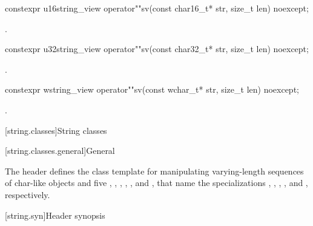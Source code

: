 %
\begin{itemdecl}
constexpr u16string_view operator""sv(const char16_t* str, size_t len) noexcept;
\end{itemdecl}
\begin{itemdescr}
\pnum
\returns
{}.
\end{itemdescr}

%
\begin{itemdecl}
constexpr u32string_view operator""sv(const char32_t* str, size_t len) noexcept;
\end{itemdecl}
\begin{itemdescr}
\pnum
\returns
{}.
\end{itemdescr}

%
\begin{itemdecl}
constexpr wstring_view operator""sv(const wchar_t* str, size_t len) noexcept;
\end{itemdecl}
\begin{itemdescr}
\pnum
\returns
{}.
\end{itemdescr}

[string.classes]{String classes}

[string.classes.general]{General}

\pnum
The header  defines the
 class template for manipulating
varying-length sequences of char-like objects and five
, ,
,
,
,
and , that name
the specializations
,
,
,
,
and
, respectively.

[string.syn]{Header  synopsis}
%

